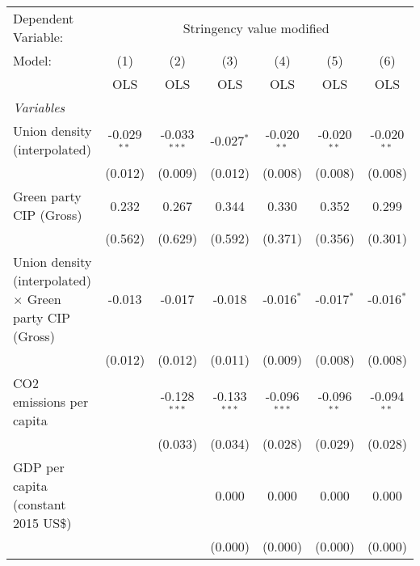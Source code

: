 
\begingroup
\centering
\begin{tabular}{lcccccc}
   \toprule
   Dependent Variable: & \multicolumn{6}{c}{Stringency value modified}\\
   Model:                                                         & (1)           & (2)            & (3)            & (4)            & (5)           & (6)\\  
                                                                  &  OLS          & OLS            & OLS            & OLS            & OLS           & OLS\\  
   \midrule
   \emph{Variables}\\
   Union density (interpolated)                                   & -0.029$^{**}$ & -0.033$^{***}$ & -0.027$^{*}$   & -0.020$^{**}$  & -0.020$^{**}$ & -0.020$^{**}$\\   
                                                                  & (0.012)       & (0.009)        & (0.012)        & (0.008)        & (0.008)       & (0.008)\\   
   Green party CIP (Gross)                                        & 0.232         & 0.267          & 0.344          & 0.330          & 0.352         & 0.299\\   
                                                                  & (0.562)       & (0.629)        & (0.592)        & (0.371)        & (0.356)       & (0.301)\\   
   Union density (interpolated) $\times$ Green party CIP (Gross)  & -0.013        & -0.017         & -0.018         & -0.016$^{*}$   & -0.017$^{*}$  & -0.016$^{*}$\\   
                                                                  & (0.012)       & (0.012)        & (0.011)        & (0.009)        & (0.008)       & (0.008)\\   
   CO2 emissions per capita                                       &               & -0.128$^{***}$ & -0.133$^{***}$ & -0.096$^{***}$ & -0.096$^{**}$ & -0.094$^{**}$\\   
                                                                  &               & (0.033)        & (0.034)        & (0.028)        & (0.029)       & (0.028)\\   
   GDP per capita (constant 2015 US\$)                            &               &                & 0.000          & 0.000          & 0.000         & 0.000\\   
                                                                  &               &                & (0.000)        & (0.000)        & (0.000)       & (0.000)\\   

\end{tabular}
